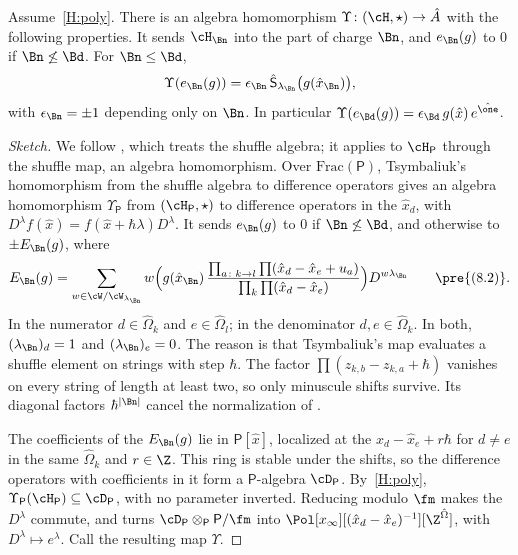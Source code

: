 \begin{lemma}\label{lem:hall-coulomb}
Assume~\ref{H:poly}.  There is an algebra homomorphism
$\Upsilon\colon(\cH,\star)\to\hat A$ with the following properties.  It sends
$\cH_\Bn$ into the part of charge $\Bn$, and $e_\Bn(g)$ to $0$ if
$\Bn\not\le\Bd$.  For $\Bn\le\Bd$,
\[
 \Upsilon(e_\Bn(g))=\epsilon_\Bn\,\hat{\mathsf S}_{\lambda_\Bn}\big(g(\hat x_\Bn)\big),
\]
with $\epsilon_\Bn=\pm1$ depending only on $\Bn$.  In particular
$\Upsilon(e_\Bd(g))=\epsilon_\Bd\,g(\hat x)\,e^{\hat\one}$.
\end{lemma}

\begin{proof}[Sketch]
We follow , which treats the shuffle algebra; it applies to
$\cH_{\mathsf P}$ through the shuffle map, an algebra homomorphism.  Over
$\mathrm{Frac}(\mathsf P)$, Tsymbaliuk's homomorphism from the shuffle
algebra to difference operators
\cite[Thm.~5.7]{tsymbaliukDifferenceOperators2023} gives an algebra
homomorphism $\Upsilon_{\mathsf P}$ from $(\cH_{\mathsf P},\star)$ to
difference operators in the $\hat x_d$, with
$D^\lambda f(\hat x)=f(\hat x+\hbar\lambda)D^\lambda$.  It sends $e_\Bn(g)$ to
$0$ if $\Bn\not\le\Bd$, and otherwise to $\pm E_\Bn(g)$, where
\[
 E_\Bn(g)=\sum_{w\in\cW/\cW_{\lambda_\Bn}}w\Big(g(\hat x_\Bn)\,
 \frac{\prod_{a\colon k\to l}\prod(\hat x_d-\hat x_e+u_a)}
      {\prod_k\prod(\hat x_d-\hat x_e)}\Big)D^{w\lambda_\Bn}
 \qquad\text{\pre{(8.2)}}.
\]
In the numerator $d\in\hat\Omega_k$ and $e\in\hat\Omega_l$; in the
denominator $d,e\in\hat\Omega_k$.  In both, $(\lambda_\Bn)_d=1$ and
$(\lambda_\Bn)_e=0$.  The reason is that Tsymbaliuk's map evaluates a shuffle
element on strings with step $\hbar$.  The factor $\prod(z_{k,b}-z_{k,a}+\hbar)$
vanishes on every string of length at least two, so only minuscule shifts
survive.  Its diagonal factors $\hbar^{|\Bn|}$ cancel the normalization of
.

The coefficients of the $E_\Bn(g)$ lie in $\mathsf P[\hat x]$, localized at the
$\hat x_d-\hat x_e+r\hbar$ for $d\neq e$ in the same $\hat\Omega_k$ and
$r\in\Z$.  This ring is stable under the shifts, so the difference operators
with coefficients in it form a $\mathsf P$-algebra $\cD_{\mathsf P}$.  By~\ref{H:poly},
$\Upsilon_{\mathsf P}(\cH_{\mathsf P})\subseteq\cD_{\mathsf P}$, with no parameter
inverted.  Reducing modulo $\fm$ makes the $D^\lambda$ commute, and turns
$\cD_{\mathsf P}\otimes_{\mathsf P}\mathsf P/\fm$ into
$\Pol[x_\infty][(\hat x_d-\hat x_e)^{-1}][\Z^{\hat\Omega}]$, with
$D^\lambda\mapsto e^\lambda$.  Call the resulting map $\Upsilon$.


\end{proof}
